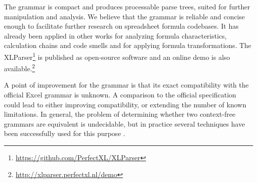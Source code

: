 \documentclass[times]{smrauth}
\begin{document}
The grammar is compact and produces processable parse trees, suited for further manipulation and analysis. We believe that the grammar is reliable and concise enough to facilitate further research on spreadsheet formula codebases. It has already been applied in other works for analyzing formula characteristics, calculation chains and code smells and for applying formula transformations. The XLParser\footnote{\url{https://github.com/PerfectXL/XLParser}} is published as open-source software and an online demo is also available.\footnote{\url{http://xlparser.perfectxl.nl/demo}}

A point of improvement for the grammar is that its exact compatibility with the official Excel grammar is unknown.
A comparison to the official specification could lead to either improving compatibility, or extending the number of known limitations.
In general, the problem of determining whether two context-free grammars are equivalent is undecidable, but in practice several techniques have been successfully used for this purpose \cite{lammel2009introduction,fischer2012comparison}.



\end{document}
